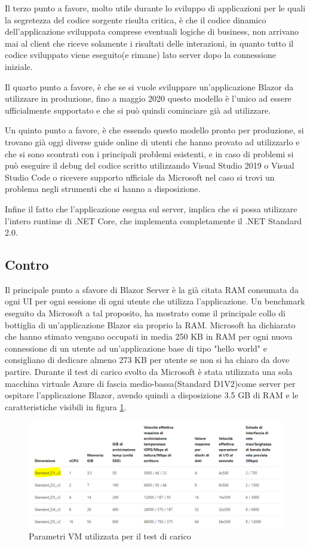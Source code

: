 Il terzo punto a favore, molto utile durante lo sviluppo di applicazioni per le quali la segretezza del codice sorgente risulta critica, \`e che il codice dinamico dell'applicazione sviluppata comprese eventuali logiche di business, non arrivano mai al client che riceve solamente i risultati delle interazioni, in quanto tutto il codice sviluppato viene eseguito(e rimane) lato server dopo la connessione iniziale.

Il quarto punto a favore, \`e che se si vuole sviluppare un'applicazione Blazor da utilizzare in produzione, fino a maggio 2020 questo modello \`e l'unico ad essere ufficialmente supportato e che si pu\`o quindi cominciare gi\`a ad utilizzare.

Un quinto punto a favore, \`e che essendo questo modello pronto per produzione, si trovano gi\`a oggi diverse guide online di utenti che hanno provato ad utilizzarlo e che si sono scontrati con i principali problemi esistenti, e in caso di problemi si pu\`o eseguire il debug del codice scritto utilizzando Visual Studio 2019 o Visual Studio Code o ricevere supporto ufficiale da Microsoft nel caso si trovi un problema negli strumenti che si hanno a disposizione.

Infine il fatto che l'applicazione esegua sul server, implica che si possa utilizzare l'intero runtime di .NET Core, che implementa completamente il .NET Standard 2.0.
\subsection{Contro}\label{sez:controBServer}
Il principale punto a sfavore di Blazor Server \`e la gi\`a citata RAM consumata da ogni UI per ogni sessione di ogni utente che utilizza l'applicazione.
Un benchmark eseguito da Microsoft a tal proposito, ha mostrato come il principale collo di bottiglia di un'applicazione Blazor sia proprio la RAM.
Microsoft ha dichiarato che hanno stimato vengano occupati in media 250 KB in RAM per ogni nuova connessione di un utente ad un'applicazione base di tipo "hello world" e consigliano di dedicare almeno 273 KB per utente se non si ha chiaro da dove partire. Durante il test di carico svolto da Microsoft \`e stata utilizzata una sola macchina virtuale Azure di fascia medio-bassa(Standard D1V2)come server per ospitare l'applicazione Blazor, avendo quindi a disposizione 3.5 GB di RAM e le caratteristiche visibili in figura \ref{fig:vmStandardD1V2}.

\begin{figure}[H]
	\centerline{\includegraphics[scale=0.5]{figure/Standard_D1_V2.PNG}}
	\caption{Parametri VM utilizzata per il test di carico}
	\label{fig:vmStandardD1V2}
\end{figure}

